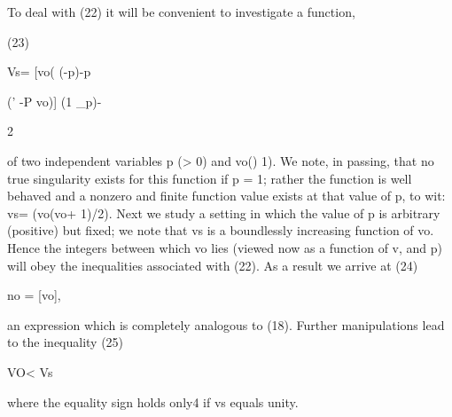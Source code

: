\documentclass[10pt]{article}
\begin{document}
\begin{ReviewVerbatim}

To deal with (22) it will be convenient to investigate a function,

(23)

Vs= [vo( (-p)-p

(' -P vo)] (1 _p)-

2

of two independent variables p (> 0) and vo() 1). We note, in passing, that no true
singularity exists for this function if p = 1; rather the function is well behaved and
a nonzero and finite function value exists at that value of p, to wit: vs= (vo(vo+ 1)/2).
Next we study a setting in which the value of p is arbitrary (positive) but fixed; we
note that vs is a boundlessly increasing function of vo. Hence the integers between
which vo lies (viewed now as a function of v, and p) will obey the inequalities associated with (22). As a result we arrive at
(24)

no = [vo],

an expression which is completely analogous to (18). Further manipulations lead
to the inequality
(25)

VO< Vs

where the equality sign holds only4 if vs equals unity.
\end{ReviewVerbatim}
\end{document}
